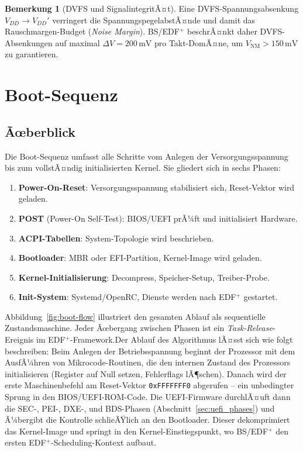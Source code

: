 ﻿\documentclass[a4paper,12pt]{scrreprt}
\theoremstyle{definition}
\newtheorem{bemerkung}{Bemerkung}[chapter]
\begin{document}
	\begin{bemerkung}[DVFS und SignalintegritÃ¤t]
		Eine DVFS-Spannungsabsenkung $V_{DD} \to V_{DD}'$ verringert die
		SpannungspegelabstÃ¤nde und damit das Rauschmargen-Budget (\emph{Noise Margin}).
		BS/EDF$^+$ beschrÃ¤nkt daher DVFS-Absenkungen auf maximal $\Delta V = 200\,\text{mV}$
		pro Takt-DomÃ¤ne, um $V_{\mathrm{NM}} > 150\,\text{mV}$ zu garantieren.
	\end{bemerkung}
	
	\chapter{Boot-Sequenz}
	
	\section{Ãœberblick}

	Die Boot-Sequenz umfasst alle Schritte vom Anlegen der Versorgungsspannung
	bis zum vollstÃ¤ndig initialisierten Kernel. Sie gliedert sich in sechs Phasen:

	\begin{enumerate}
		\item \textbf{Power-On-Reset}: Versorgungsspannung stabilisiert sich,
		Reset-Vektor wird geladen.
		\item \textbf{POST} (Power-On Self-Test): BIOS/UEFI prÃ¼ft und initialisiert
		Hardware.
		\item \textbf{ACPI-Tabellen}: System-Topologie wird beschrieben.
		\item \textbf{Bootloader}: MBR oder EFI-Partition, Kernel-Image wird geladen.
		\item \textbf{Kernel-Initialisierung}: Decompress, Speicher-Setup,
		Treiber-Probe.
		\item \textbf{Init-System}: Systemd/OpenRC, Dienste werden nach EDF$^+$
		gestartet.
	\end{enumerate}

	Abbildung~\ref{fig:boot-flow} illustriert den gesamten Ablauf als
	sequentielle Zustandsmaschine. Jeder Ãœbergang zwischen Phasen ist ein
	\emph{Task-Release}-Ereignis im EDF$^+$-Framework.Der Ablauf des Algorithmus lÃ¤sst sich wie folgt beschreiben: 
	Beim Anlegen der Betriebsspannung beginnt der Prozessor mit dem AusfÃ¼hren von
	Mikrocode-Routinen, die den internen Zustand des Prozessors initialisieren
	(Register auf Null setzen, Fehlerflags lÃ¶schen). Danach wird der erste
	Maschinenbefehl am Reset-Vektor \texttt{0xFFFFFFF0} abgerufen -- ein
	unbedingter Sprung in den BIOS/UEFI-ROM-Code. Die UEFI-Firmware durchlÃ¤uft
	dann die SEC-, PEI-, DXE-, und BDS-Phasen (Abschnitt~\ref{sec:uefi_phases})
	und Ã¼bergibt die Kontrolle schlieÃŸlich an den Bootloader. Dieser
	dekomprimiert das Kernel-Image und springt in den Kernel-Einstiegspunkt,
	wo BS/EDF$^+$ den ersten EDF$^+$-Scheduling-Kontext aufbaut.
\end{document}
